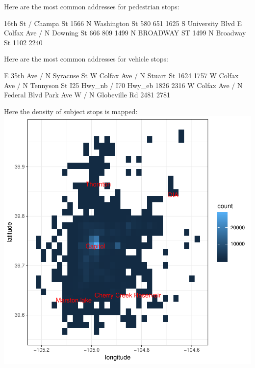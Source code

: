 \documentclass{article}
\begin{document}
Here are the most common addresses for pedestrian stops:\\

\begin{Schunk}
\begin{Soutput}
        16th St / Champa St        1566 N Washington St 
                        580                         651 
     1625 S University Blvd E Colfax Ave / N Downing St 
                        666                         809 
         1499 N BROADWAY ST          1499 N Broadway St 
                       1102                        2240 
\end{Soutput}
\end{Schunk}

Here are the most common addresses for vehicle stops:\\

\begin{Schunk}
\begin{Soutput}
   E 35th Ave / N Syracuse St    W Colfax Ave / N Stuart St 
                         1624                          1757 
 W Colfax Ave / N Tennyson St       I25 Hwy_nb / I70 Hwy_eb 
                         1826                          2316 
W Colfax Ave / N Federal Blvd  Park Ave W / N Globeville Rd 
                         2481                          2781 
\end{Soutput}
\end{Schunk}

Here the density of subject stops is mapped:\\

\includegraphics{DenverPoliceStops-005}
\end{document}
